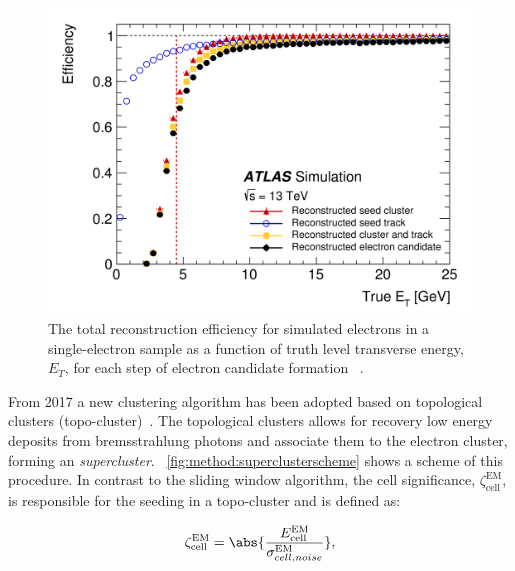\begin{figure}[]
    \centering
    \includegraphics[width=\mediumfigwidth]{images/2015_2016_recoeff.png}
    \caption[Total reconstruction energy for simulated electrons using the sliding window algorithm]{The total reconstruction efficiency for simulated electrons in a single-electron sample as a function of truth level transverse energy, $E_T$, for each step of electron candidate formation ~\cite{slidingwindowreco}.}
    \label{fig:method:slidingwindow-reco}
\end{figure}

From 2017 a new clustering algorithm has been adopted based on topological clusters (topo-cluster)~\cite{Aad:2019tso}. The topological clusters allows for recovery low energy deposits from bremsstrahlung photons and associate them to the electron cluster, forming an \emph{supercluster}. ~\cref{fig:method:superclusterscheme} shows a scheme of this procedure. In contrast to the sliding window algorithm, the cell significance, $\zeta^{\mathrm{EM}}_{\mathrm{cell}}$, is responsible for the seeding in a topo-cluster and is defined as:

\begin{equation}
    \zeta^{\mathrm{EM}}_{\mathrm{cell}} = \abs{\frac{E^{\mathrm{EM}}_{\mathrm{cell}}}{\sigma^{\mathrm{EM}}_{cell,noise}}},
\end{equation}

